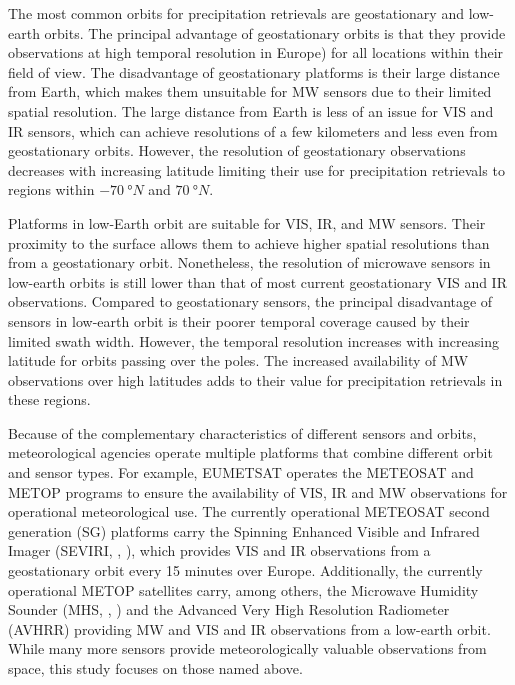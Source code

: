 \documentclass[11pt]{scrartcl}
\begin{document}
The most common orbits for precipitation retrievals are geostationary and
low-earth orbits. The principal advantage of geostationary orbits is that they
provide observations at high temporal resolution  in
Europe) for all locations within their field of view. The disadvantage of
geostationary platforms is their large distance from Earth, which makes them
unsuitable for MW sensors due to their limited spatial resolution. The large
distance from Earth is less of an issue for VIS and IR sensors, which can
achieve resolutions of a few kilometers and less even from geostationary orbits.
However, the resolution of geostationary observations decreases with
increasing latitude limiting their use for precipitation retrievals to regions within
\(\SI{-70}{\degree N}\) and \(\SI{70}{\degree N}\).

Platforms in low-Earth orbit are suitable for VIS, IR, and MW sensors. Their
proximity to the surface allows them to achieve higher spatial resolutions than
from a geostationary orbit. Nonetheless, the resolution of microwave sensors in
low-earth orbits is still lower than that of most current geostationary VIS and IR
observations. Compared to geostationary sensors, the principal disadvantage of
sensors in low-earth orbit is their poorer temporal coverage caused by their
limited swath width. However, the temporal resolution increases with increasing
latitude for  orbits passing over the poles. The increased
availability of MW observations over high latitudes adds to their value for
precipitation retrievals in these regions.


Because of the complementary characteristics of different sensors and orbits,
meteorological agencies operate multiple platforms that combine different orbit
and sensor types. For example, EUMETSAT operates the METEOSAT and METOP programs
to ensure the availability of VIS, IR and MW observations for operational
meteorological use. The currently operational METEOSAT second generation (SG)
platforms carry the Spinning Enhanced Visible and Infrared Imager (SEVIRI,
\citeauthor{aminou02}, \citeyear{aminou02}), which provides VIS and IR
observations from a geostationary orbit every 15 minutes over Europe. Additionally, the
currently operational METOP satellites carry, among others, the Microwave
Humidity Sounder (MHS, \citeauthor{bonsignori07}, \citeyear{bonsignori07}) and
the Advanced Very High Resolution Radiometer (AVHRR) providing MW and VIS and IR
observations from a low-earth orbit. While many more sensors provide
meteorologically valuable observations from space, this study focuses on those
named above.
\end{document}
